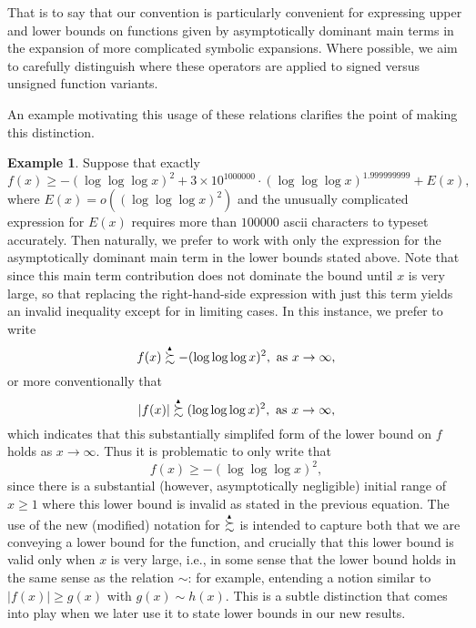 \documentclass[11pt,reqno,a4letter]{article}
\numberwithin{figure}{section}
\numberwithin{table}{section}
\theoremstyle{plain}
\numberwithin{theorem}{section}
\theoremstyle{definition}
\newtheorem{example}[theorem]{Example}
\newcommand{\SuccSim}[0]{\overset{_{\scriptsize{\blacktriangle}}}{\succsim}}
\begin{document}
That is to say that our convention is particularly 
convenient for expressing upper and lower bounds on functions given by asymptotically dominant 
main terms in the expansion of more complicated symbolic expansions. 
Where possible, we aim to carefully distinguish where these 
operators are applied to signed versus unsigned function variants. 

An example motivating this usage of these 
relations clarifies the point of making this distinction. 

\begin{example}
Suppose that exactly
\[
f(x) \geq -(\log\log\log x)^2 + 3 \times 10^{1000000} \cdot (\log\log\log x)^{1.999999999} + E(x), 
\]
where $E(x) = o\left((\log\log\log x)^2\right)$ and the unusually complicated expression for $E(x)$ requires 
more than $100000$ ascii characters to typeset accurately. Then naturally, we prefer to work with only the expression
for the asymptotically dominant main term in the lower bounds stated above. Note that since this main term contribution 
does not dominate the bound until $x$ is very large, so that replacing the right-hand-side expression with just this 
term yields an invalid inequality except for in limiting cases. In this instance, we prefer to write 
\[
f(x) \SuccSim -(\log\log\log x)^2, \mathrm{\ as \ } x \rightarrow \infty, 
\]
or more conventionally that 
\[
|f(x)| \SuccSim (\log\log\log x)^2, \mathrm{\ as \ } x \rightarrow \infty, 
\]
which indicates that this substantially simplifed form of the lower bound on $f$ holds as $x \rightarrow \infty$. 
Thus it is problematic to only write that 
\[
f(x) \geq -(\log\log\log x)^2, 
\]
since there is a substantial (however, asymptotically negligible) initial range of $x \geq 1$ where this lower bound is 
invalid as stated in the previous equation. 
The use of the new (modified) notation for $\SuccSim$ is intended to capture both that we are conveying a lower bound for the 
function, and crucially that this lower bound is valid only when $x$ is very large, i.e., in some sense that the lower bound 
holds in the same sense as the relation $\sim$: for example, entending a notion similar to 
$|f(x)| \geq g(x)$ with $g(x) \sim h(x)$. 
This is a subtle distinction that comes into play when we later use it to state lower bounds in our new results. 
\end{example} 
\end{document}
